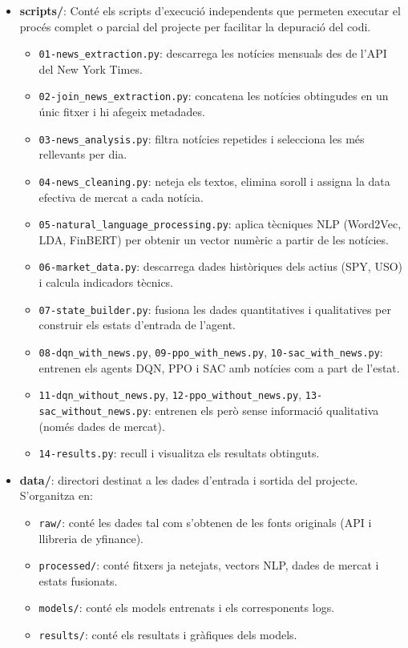 \documentclass[12pt,a4paper,twoside]{book}
\begin{document}
\begin{itemize}
    \item \textbf{scripts/}: Conté els scripts d'execució independents que permeten executar el procés complet o parcial del projecte per facilitar la depuració del codi.
    \begin{itemize}
        \item \texttt{01-news\_extraction.py}: descarrega les notícies mensuals des de l'API del New York Times.
        \item \texttt{02-join\_news\_extraction.py}: concatena les notícies obtingudes en un únic fitxer i hi afegeix metadades.
        \item \texttt{03-news\_analysis.py}: filtra notícies repetides i selecciona les més rellevants per dia.
        \item \texttt{04-news\_cleaning.py}: neteja els textos, elimina soroll i assigna la data efectiva de mercat a cada notícia.
        \item \texttt{05-natural\_language\_processing.py}: aplica tècniques NLP (Word2Vec, LDA, FinBERT) per obtenir un vector numèric a partir de les notícies.
        \item \texttt{06-market\_data.py}: descarrega dades històriques dels actius (SPY, USO) i calcula indicadors tècnics.
        \item \texttt{07-state\_builder.py}: fusiona les dades quantitatives i qualitatives per construir els estats d'entrada de l'agent.
        \item \texttt{08-dqn\_with\_news.py}, \texttt{09-ppo\_with\_news.py}, \texttt{10-sac\_with\_news.py}: entrenen els agents DQN, PPO i SAC amb notícies com a part de l'estat.
        \item \texttt{11-dqn\_without\_news.py}, \texttt{12-ppo\_without\_news.py}, \texttt{13-sac\_without\_news.py}: entrenen els però sense informació qualitativa (només dades de mercat).
        \item \texttt{14-results.py}: recull i visualitza els resultats obtinguts.
    \end{itemize}

    \item \textbf{data/}: directori destinat a les dades d'entrada i sortida del projecte. S'organitza en:
    \begin{itemize}
        \item \texttt{raw/}: conté les dades tal com s'obtenen de les fonts originals (API i llibreria de yfinance).
        \item \texttt{processed/}: conté fitxers ja netejats, vectors NLP, dades de mercat i estats fusionats.
        \item \texttt{models/}: conté els models entrenats i els corresponents logs.
        \item \texttt{results/}: conté els resultats i gràfiques dels models.
    \end{itemize}


\end{itemize}
\end{document}
